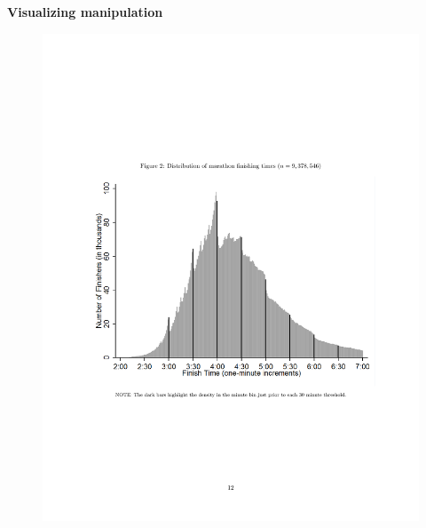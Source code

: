 \documentclass[notes=show]{beamer}
\begin{document}
\begin{frame}[shrink=20,plain]
	\begin{center}
	\textbf{Visualizing manipulation}
	\end{center}
 
        \begin{center}
		\begin{figure}
		\begin{columns}
		
		\includegraphics[scale=0.4]{./lecture_includes/marathon_heaping.pdf}

\end{columns}
\end{figure}
\end{center}
\end{frame}
\end{document}
